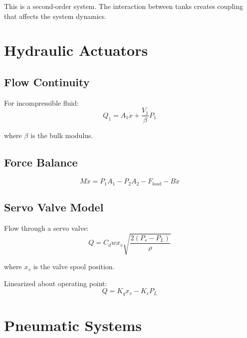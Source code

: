 This is a second-order system. The interaction between tanks creates coupling that affects the system dynamics.

\section{Hydraulic Actuators}
\label{sec:hydraulic}



\subsection{Flow Continuity}

For incompressible fluid:
\begin{equation}
Q_1 = A_1\dot{x} + \frac{V_1}{\beta}\dot{P}_1
\end{equation}

where $\beta$ is the bulk modulus.

\subsection{Force Balance}

\begin{equation}
M\ddot{x} = P_1 A_1 - P_2 A_2 - F_{\text{load}} - B\dot{x}
\end{equation}

\subsection{Servo Valve Model}

Flow through a servo valve:
\begin{equation}
Q = C_d w x_v \sqrt{\frac{2(P_s - P_L)}{\rho}}
\end{equation}

where $x_v$ is the valve spool position.

Linearized about operating point:
\begin{equation}
Q = K_q x_v - K_c P_L
\end{equation}

\section{Pneumatic Systems}
\label{sec:pneumatic}

